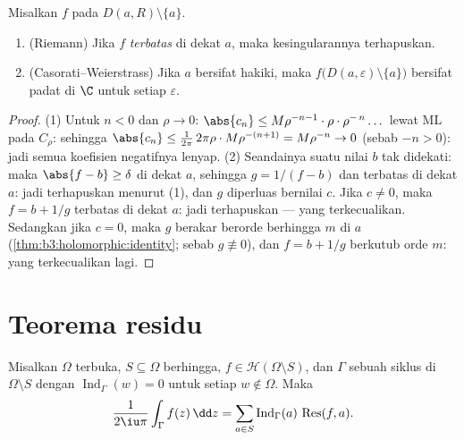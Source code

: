 \begin{theorem}
\label{thm:b3:residues:riemanncw}
Misalkan $f$  pada $D(a,R)\setminus\{a\}$.
\begin{enumerate}
  \item (Riemann) Jika $f$ \emph{terbatas} di dekat $a$, maka
        kesingularannya terhapuskan.
  \item (Casorati--Weierstrass) Jika $a$ bersifat hakiki, maka
        $f\bigl(D(a,\varepsilon)\setminus\{a\}\bigr)$ bersifat padat
        di $\C$ untuk setiap $\varepsilon$.
\end{enumerate}
\end{theorem}

\begin{proof}
(1) Untuk $n < 0$ dan $\rho \to 0$: $\abs{c_n} \leq
M\rho^{-n-1}\cdot\rho\cdot\rho^{-\,n}\dots$ lewat ML pada
$C_\rho$: sehingga $\abs{c_n} \leq \frac{1}{2\pi}\,2\pi\rho\cdot
M\rho^{-(n+1)} = M\rho^{-n} \to 0$ (sebab $-n > 0$): jadi semua
koefisien negatifnya lenyap.
(2) Seandainya suatu nilai $b$ tak didekati: maka $\abs{f - b} \geq
\delta$ di dekat $a$, sehingga $g = 1/(f - b)$  dan
terbatas di dekat $a$: jadi terhapuskan menurut (1), dan $g$ diperluas bernilai $c$.
Jika $c \neq 0$, maka $f = b + 1/g$ terbatas di dekat $a$: jadi terhapuskan
--- yang terkecualikan. Sedangkan jika $c = 0$, maka $g$ berakar berorde berhingga $m$
di $a$ (\cref{thm:b3:holomorphic:identity}; sebab $g \not\equiv 0$),
dan $f = b + 1/g$ berkutub orde $m$: yang terkecualikan lagi.
\end{proof}

\section{Teorema residu}

\begin{theorem}\label{thm:b3:residues:residue}
Misalkan $\Omega$ terbuka, $S \subseteq \Omega$ berhingga, $f \in
\mathcal H(\Omega\setminus S)$, dan $\Gamma$ sebuah siklus di
$\Omega\setminus S$ dengan $\operatorname{Ind}_\Gamma(w) = 0$
untuk setiap $w \notin \Omega$. Maka
\[
\frac{1}{2\iu\pi}\int_\Gamma f(z)\,\dd z
= \sum_{a\in S}\operatorname{Ind}_\Gamma(a)\,
\operatorname{Res}(f, a) .
\]
\end{theorem}

